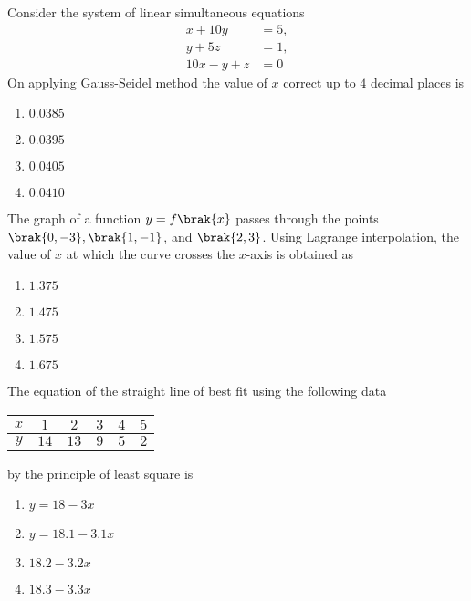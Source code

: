 \item{
Consider the system of linear simultaneous equations
\begin{align}
x+10y &= 5, \\
y+5z &= 1, \\
10x-y+z &= 0
\end{align}
On applying Gauss-Seidel method the value of $x$ correct up to $4$ decimal places is
\begin{multicols}{4}
\begin{enumerate}
\item $0.0385$
\item $0.0395$
\item $0.0405$
\item $0.0410$
\end{enumerate}
\end{multicols}
}
\item{
The graph of a function $y=f\brak{x}$ passes through the points $\brak{0,-3},\brak{1,-1}$, and $\brak{2,3}$. Using Lagrange interpolation, the value of $x$ at which the curve crosses the $x$-axis is obtained as
\begin{multicols}{4}
\begin{enumerate}
\item $1.375$
\item $1.475$
\item $1.575$
\item $1.675$
\end{enumerate}
\end{multicols}
}
\item{
The equation of the straight line of best fit using the following data 
\begin{table}[h!]   
  \centering
  \begin{tabular}[10pt]{ |c| c| c| c| c| c|}
    \hline
     $x$&$1$&$2$&$3$&$4$&$5$\\ 
    \hline
    $y$&$14$&$13$&$9$&$5$&$2$\\
    \hline 
    \end{tabular}
\end{table}
by the principle of least square is
\begin{multicols}{4}
\begin{enumerate}
\item $y=18-3x$
\item $y=18.1-3.1x$
\item $18.2-3.2x$
\item $18.3-3.3x$
\end{enumerate}
\end{multicols}
}
